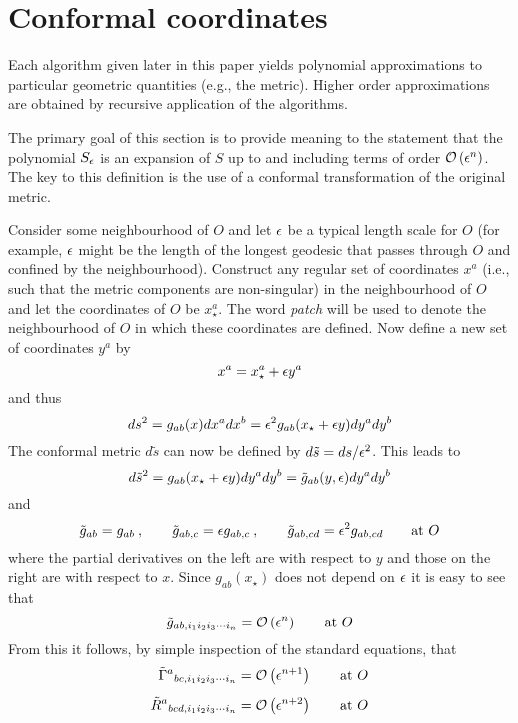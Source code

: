 \documentclass[a4paper,12pt]{article}
\numberwithin{equation}{section}
\begin{document}
\section{Conformal coordinates}\label{sec:Conformal}

Each algorithm given later in this paper yields polynomial approximations to particular
geometric quantities (e.g., the metric). Higher order approximations are obtained by
recursive application of the algorithms.

The primary goal of this section is to provide meaning to the statement that the polynomial
$S_{\epsilon}$ is an expansion of $S$ up to and including terms of order $\mathcal{O}\left(\epsilon^n\right)$. The
key to this definition is the use of a conformal transformation of the original metric.

Consider some neighbourhood of $O$ and let $\epsilon$ be a typical length scale for $O$ (for
example, $\epsilon$ might be the length of the longest geodesic that passes through $O$ and
confined by the neighbourhood). Construct any regular set of coordinates $x^a$ (i.e., such
that the metric components are non-singular) in the neighbourhood of $O$ and let the
coordinates of $O$ be $x^a_{\star}$. The word \emph{patch} will be used to denote the
neighbourhood of $O$ in which these coordinates are defined. Now define a new set of
coordinates $y^a$ by
\[
x^a = x^a_{\star} + \epsilon y^a
\]
and thus
\[
  ds^2 = g_{ab}(x)dx^a dx^b
       = \epsilon^2 g_{ab}(x_{\star} + \epsilon y) dy^a dy^b
\]
The conformal metric $d\tilde s$ can now be defined by $d\tilde s = ds/\epsilon^2$. This leads to
\[
d{\tilde s}^2 = g_{ab}(x_{\star} + \epsilon y) dy^a dy^b
              = {\tilde g}_{ab}(y,\epsilon) dy^a dy^b
\]
and
\[
{\tilde g}_{ab} = g_{ab}\>,\qquad
{\tilde g}_{ab,c} = \epsilon g_{ab,c}\>,\qquad
{\tilde g}_{ab,cd} = \epsilon^2 g_{ab,cd}\qquad \text{at }O
\]
where the partial derivatives on the left are with respect to $y$ and those on
the right are with respect to $x$. Since $g_{ab}(x_{\star})$ does not depend on $\epsilon$
it is easy to see that
\begin{equation*}
{\tilde g}_{ab,i_1i_2i_3\cdots i_n} = \mathcal{O}\left(\epsilon^n\right)\qquad \text{at }O
\end{equation*}
From this it follows, by simple inspection of the standard equations, that
\begin{align*}
{\tilde\Gamma}^{a}{}_{bc,i_1i_2i_3\cdots i_n} &= \mathcal{O}\left(\epsilon^{n+1}\right)\qquad \text{at }O\\[5pt]
{\tilde R}^{a}{}_{bcd,i_1i_2i_3\cdots i_n} &= \mathcal{O}\left(\epsilon^{n+2}\right)\qquad \text{at }O
\end{align*}
\end{document}
